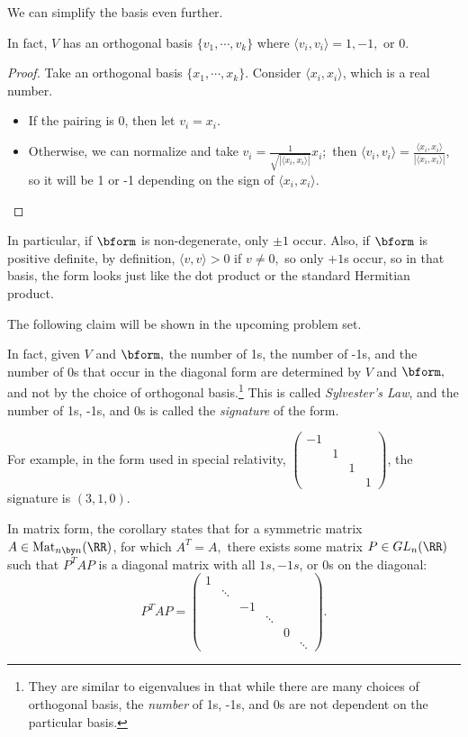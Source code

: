 We can simplify the basis even further.
\begin{corollary}
In fact, $V$ has an orthogonal basis $\{v_1, \cdots, v_k\}$ where $\langle v_i, v_i\rangle = 1, -1,$ or 0. 
\end{corollary}
\begin{proof}
Take an orthogonal basis $\{x_1, \cdots, x_k\}$. Consider $\langle x_i, x_i \rangle$, which is a real number.
\begin{itemize}
    \item If the pairing is 0, then let $v_i = x_i.$
    \item Otherwise, we can normalize and take $v_i = \frac{1}{\sqrt{|\langle x_i, x_i \rangle|}}x_i;$ then $\langle v_i, v_i \rangle = \frac{\langle x_i, x_i \rangle}{|\langle x_i, x_i \rangle|},$ so it will be 1 or -1 depending on the sign of $\langle x_i, x_i \rangle.$
\end{itemize}
\end{proof}

In particular, if $\bform$ is non-degenerate, only $\pm 1$ occur. Also, if $\bform$ is positive definite, by definition, $\langle v, v \rangle > 0$ if $v \neq 0,$ so only $+1$s occur, so in that basis, the form looks just like the dot product or the standard Hermitian product.

The following claim will be shown in the upcoming problem set.

\begin{claim}
In fact, given $V$ and $\bform,$ the number of 1s, the number of -1s, and the number of 0s that occur in the diagonal form are determined by $V$ and $\bform,$ and not by the choice of orthogonal basis.\footnote{They are similar to eigenvalues in that while there are many choices of orthogonal basis, the \emph{number} of 1s, -1s, and 0s are not dependent on the particular basis.} This is called \emph{Sylvester's Law}, and the number of 1s, -1s, and 0s is called the \emph{signature} of the form. 
\end{claim}

For example, in the form used in special relativity, $\begin{pmatrix}-1 & & & \\ & 1 & & \\ & & 1 & \\ & & & 1\end{pmatrix}$, the signature is $(3, 1, 0).$

In matrix form, the corollary states that for a symmetric matrix $A \in \text{Mat}_{n \by n}(\RR)$, for which $A^T = A,$ there exists some matrix $P \in GL_n(\RR)$ such that $P^TAP$ is a diagonal matrix with all $1s, -1s$, or 0s on the diagonal:
\[
P^TAP = \begin{pmatrix} 1 & & & & & \\ & \ddots & & & &  \\ & & -1 & & &  \\ & & & \ddots & & \\ & & & & 0 & \\ & & & & & \ddots \end{pmatrix}.
\]

